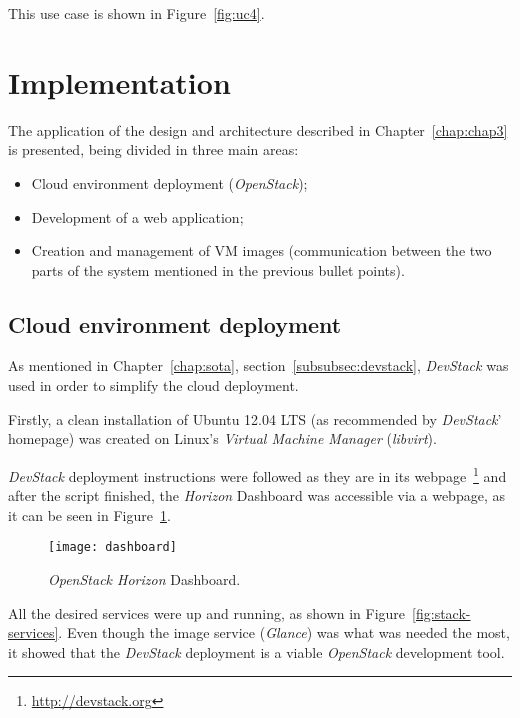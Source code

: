 This use case is shown in Figure~\ref{fig:uc4}.


\section{Implementation}\label{sec:implementation}


The application of the design and architecture described in Chapter~\ref{chap:chap3} is presented, being divided in three main areas:

\begin{itemize}
\item Cloud environment deployment (\textit{OpenStack});
\item Development of a web application;
\item Creation and management of VM images (communication between the two parts of the system mentioned in the previous bullet points).
\end{itemize}

\subsection{Cloud environment deployment}\label{subsec:cloud_env}

As mentioned in Chapter~\ref{chap:sota}, section~\ref{subsubsec:devstack}, \textit{DevStack} was used in order to simplify the cloud deployment.

Firstly, a clean installation of Ubuntu 12.04 LTS (as recommended by \textit{DevStack}' homepage) was created on Linux's \textit{Virtual Machine Manager} (\textit{libvirt}).

\textit{DevStack} deployment instructions were followed as they are in its webpage~\footnote{\url{http://devstack.org}} and after the script finished, the \textit{Horizon} Dashboard was accessible via a webpage, as it can be seen in Figure~\ref{fig:stack-dashboard}.

\begin{figure}[t]
  \begin{center}
    \leavevmode
    \texttt{[image: dashboard]}
    \caption{\textit{OpenStack Horizon} Dashboard.}
    \label{fig:stack-dashboard}
  \end{center}
\end{figure}

All the desired services were up and running, as shown in Figure~\ref{fig:stack-services}. Even though the image service (\textit{Glance}) was what was needed the most, it showed that the \textit{DevStack} deployment is a viable \textit{OpenStack} development tool.

